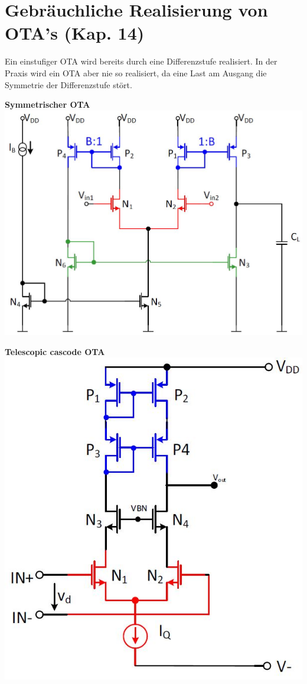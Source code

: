 \newpage
\section{Gebräuchliche Realisierung von OTA's (Kap. 14)}
Ein einstufiger OTA wird bereits durch eine Differenzstufe realisiert.
In der Praxis wird ein OTA aber nie so realisiert, da eine Last am Ausgang die Symmetrie der Differenzstufe stört.\\[2ex]
\begin{minipage}[t]{0.25\textwidth}
	\textbf{Symmetrischer OTA}\\
	\includegraphics[width=1\linewidth]{chapters/OTA/images/SymmetrischerOTA}\\
\end{minipage}
\begin{minipage}[t]{0.25\textwidth}
	\textbf{Telescopic cascode OTA}\\
	\includegraphics[width=0.7\linewidth]{chapters/OTA/images/TelescopicCascodeOTA}\\
\end{minipage}
